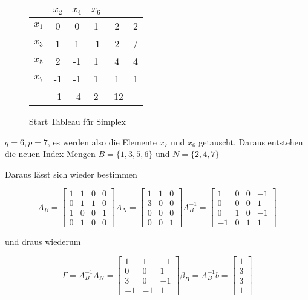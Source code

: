 \documentclass[a4paper, 12pt]{report}
\begin{document}
\begin{figure}[H]
  \centering
  \def\arraystretch{1.25}
  \begin{tabular}{l|c c c|c|c}
    & $x_2$ & $x_4$ & $x_6$ & &\\
    \hline
    $x_1$ & 0 & 0 & 1 & 2 & 2\\
    $x_3$ & 1 & 1 & -1 & 2 & /\\
    $x_5$ & 2 & -1 & 1 & 4 & 4\\
    $x_7$ & -1 & -1 & \colorbox{blue!30}{1} & 1 & 1\\
    \hline
    & -1 & -4 & 2 & -12 &
  \end{tabular}
  \caption{Start Tableau für Simplex}
\end{figure}

$q = 6, p = 7$, es werden also die Elemente $x_7$ und $x_6$ getauscht. Daraus entstehen die neuen Index-Mengen
$B = \{1, 3, 5, 6\}$ und $N=\{2, 4, 7\}$

Daraus lässt sich wieder bestimmen

$$ A_B = \begin{bmatrix} 1 & 1 & 0 & 0\\0 & 1 & 1 & 0\\1 & 0 & 0 & 1\\0 & 1 & 0 & 0 \end{bmatrix} A_N = \begin{bmatrix} 1 & 1 & 0\\3 & 0 & 0\\0 & 0 & 0\\0 & 0 & 1 \end{bmatrix} A_B^{-1} = \begin{bmatrix} 1 & 0 & 0 & -1\\0 & 0 & 0 & 1\\0 & 1 & 0 & -1\\-1 & 0 & 1 & 1 \end{bmatrix} $$

und draus wiederum

$$ \Gamma = A_B^{-1}A_N = \begin{bmatrix} 1 & 1 & -1\\0 & 0 & 1\\3 & 0 & -1\\-1 & -1 & 1 \end{bmatrix} \beta_B = A_B^{-1}b = \begin{bmatrix} 1\\3\\3\\1 \end{bmatrix} $$
\end{document}

